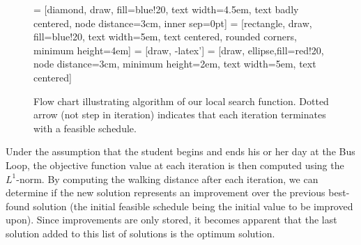 \documentclass[11pt, oneside]{article}   	%
\begin{document}
\begin{figure}[h]

 = [diamond, draw, fill=blue!20, 
    text width=4.5em, text badly centered, node distance=3cm, inner sep=0pt]
 = [rectangle, draw, fill=blue!20, 
    text width=5em, text centered, rounded corners, minimum height=4em]
 = [draw, -latex']
 = [draw, ellipse,fill=red!20, node distance=3cm,
    minimum height=2em, text width=5em, text centered]
    

\caption{Flow chart illustrating algorithm of our local search function. Dotted arrow (not step in iteration) indicates that each iteration terminates with a feasible schedule.}
\label{method}
\end{figure}

Under the assumption that the student begins and ends his or her day at the Bus Loop, the objective function value at each iteration is then computed using the $L^1$-norm. By computing the walking distance after each iteration, we can determine if the new solution represents an improvement over the previous best-found solution (the initial feasible schedule being the initial value to be improved upon). Since improvements are only stored, it becomes apparent that the last solution added to this list of solutions is the optimum solution.
\end{document}

